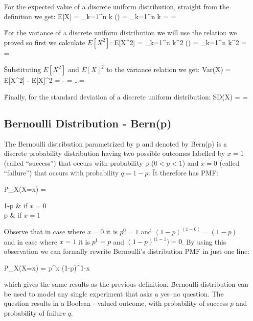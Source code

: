 For the expected value of a discrete uniform distribution, straight from the definition we get:
\bse
E[X] = \sum_{k=1}^n k () =  \sum_{k=1}^n k =   = 
\ese

\v

For the variance of a discrete uniform distribution we will use the relation we proved so first we calculate $E[X^2]$:
\bse
E[X^2] = \sum_{k=1}^n k^2 () =  \sum_{k=1}^n k^2 =  
= 
\ese

\v

Substituting $E[X^2]$ and $E[X]^2$ to the variance relation we get:
\bse
Var(X) = E[X^{2}] - E[X]^{2} =  -  = \ldots = 
\ese

\v

Finally, for the standard deviation of a discrete uniform distribution:
\bse
SD(X) =  = 
\ese

\subsection{Bernoulli Distribution - Bern(p)}

The Bernoulli distribution parametrized by p and denoted by Bern(p) is a discrete probability distribution having two
possible outcomes labelled by $x=1$ (called ``success'') that occurs with probability p ($ 0<p<1$) and $x=0$
(called ``failure'') that occurs with probability $q=1-p$. \v

It therefore has PMF:

\bse
P_{X}(X=x) = \begin{cases*} 1-p & if $x = 0$ \\ p & if $x = 1$ \end{cases*}
\ese
\ed

Observe that in case where $x=0$ it is $p^0 = 1$ and $(1-p)^{(1-0)} = (1-p)$ and in case where $x=1$ it is $p^1 = p$
and $(1-p)^{(1-1}) = 0$. By using this observation we can formally rewrite Bernoulli's distribution PMF in just one
line:

\bse
P_{X}(X=x) = p^{x} (1-p)^{1-x}
\ese
\ed

which gives the same results as the previous definition. \v

Bernoulli distribution can be used to model any single experiment that asks a yes–no question. The question results
in a Boolean - valued outcome, with probability of success $p$ and probability of failure $q$.

